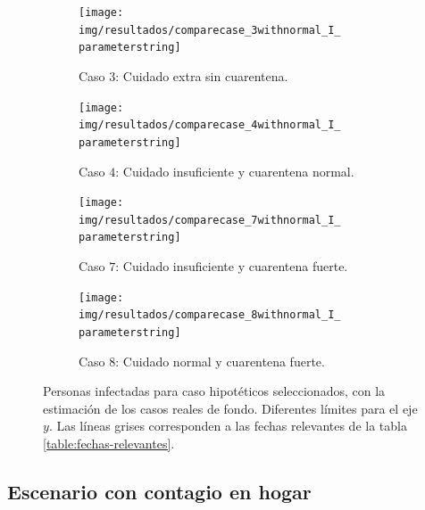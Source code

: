 \begin{figure}[H]
     \centering
     \begin{subfigure}[b]{.47\textwidth}
         \centering
         \texttt{[image: img/resultados/comparecase\_3withnormal\_I\_\\parameterstring]}
         \caption{Caso \(3\): Cuidado extra sin cuarentena.}
         \label{img:esc-beta-grande-c3}
     \end{subfigure}
     \hfill
     \begin{subfigure}[b]{.47\textwidth}
         \centering
         \texttt{[image: img/resultados/comparecase\_4withnormal\_I\_\\parameterstring]}
         \caption{Caso \(4\): Cuidado insuficiente y cuarentena normal.}
         \label{img:esc-beta-grande-c4}
     \end{subfigure}
     \hfill
     \begin{subfigure}[b]{.47\textwidth}
         \centering
         \texttt{[image: img/resultados/comparecase\_7withnormal\_I\_\\parameterstring]}
         \caption{Caso \(7\): Cuidado insuficiente y cuarentena fuerte.}
         \label{img:esc-beta-grande-c7}
     \end{subfigure}
     \hfill
     \begin{subfigure}[b]{.47\textwidth}
         \centering
         \texttt{[image: img/resultados/comparecase\_8withnormal\_I\_\\parameterstring]}
         \caption{Caso \(8\): Cuidado normal y cuarentena fuerte.}
         \label{img:esc-beta-grande-c8}
     \end{subfigure}
     \hfill 
    \begin{subfigure}[b]{0.99\textwidth}
    \centering
    \scalebox{0.7}{
    
    }
    \end{subfigure}
        \caption[Personas infectadas para casos hipotéticos seleccionados. Escenario \(\beta_{\text{exterior}} >> 1\).]{Personas infectadas para caso hipotéticos seleccionados, con la estimación de los casos reales de fondo. Diferentes límites para el eje \(y\). Las líneas grises corresponden a las fechas relevantes de la tabla \ref{table:fechas-relevantes}.}
        \label{img:hip-3478-I-comp}
\end{figure}


\subsection{Escenario con contagio en hogar}\label{eval:beta-chico}


